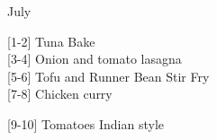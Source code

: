 		\begin{menu}{July}
    
    \begin{recipelist}
    
        {\scriptsize[1-2]} Tuna Bake\\
        {\scriptsize[3-4]} Onion and tomato lasagna\\
        {\scriptsize[5-6]} Tofu and Runner Bean Stir Fry\\
        {\scriptsize[7-8]} Chicken curry\\%
    \end{recipelist}%
    \begin{recipelist}
    
        {\scriptsize[9-10]} Tomatoes Indian style\\
    \end{recipelist}\par%
  

\end{menu}
